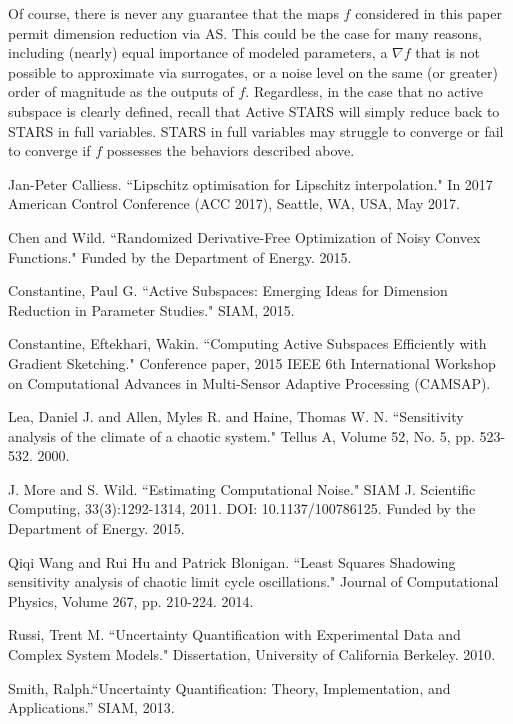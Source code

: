\documentclass{amsart}
\begin{document}
Of course, there is never any guarantee that the maps $f$ considered in this paper permit dimension reduction via AS. This could be the case for many reasons, including (nearly) equal importance of modeled parameters, a $\nabla f$ that is not possible to approximate via surrogates, or a noise level on the same (or greater) order of magnitude as the outputs of $f$. Regardless, in the case that no active subspace is clearly defined, recall that Active STARS will simply reduce back to STARS in full variables. STARS in full variables may struggle to converge or fail to converge if $f$ possesses the behaviors described above.


\begin{thebibliography}{65}





 Jan-Peter Calliess. ``Lipschitz optimisation for Lipschitz interpolation." In 2017 American Control Conference (ACC 2017), Seattle, WA, USA, May 2017.

 Chen and Wild. ``Randomized Derivative-Free Optimization of Noisy Convex Functions." Funded by the Department of Energy. 2015.

 Constantine, Paul G. ``Active Subspaces: Emerging Ideas for Dimension Reduction in Parameter Studies." SIAM, 2015.

 Constantine, Eftekhari, Wakin. ``Computing Active Subspaces Efficiently with Gradient Sketching." Conference paper, 2015 IEEE 6th International Workshop on Computational Advances in Multi-Sensor Adaptive Processing (CAMSAP).


 Lea, Daniel J. and Allen, Myles R. and Haine, Thomas W. N. ``Sensitivity analysis of the climate of a chaotic system." Tellus A, Volume 52, No. 5, pp. 523-532. 2000.

 J. More and S. Wild. ``Estimating Computational Noise." SIAM J. Scientific Computing, 33(3):1292-1314, 2011. DOI: 10.1137/100786125. Funded by the Department of Energy. 2015.


 Qiqi Wang and Rui Hu and Patrick Blonigan. ``Least Squares Shadowing sensitivity analysis of chaotic limit cycle oscillations." Journal of Computational Physics, Volume 267, pp. 210-224. 2014.

 Russi, Trent M. ``Uncertainty Quantification with Experimental Data and Complex System Models." Dissertation, University of California Berkeley. 2010.

  Smith, Ralph.``Uncertainty Quantification: Theory, Implementation, and Applications.” SIAM, 2013.




\end{thebibliography}
\end{document}
